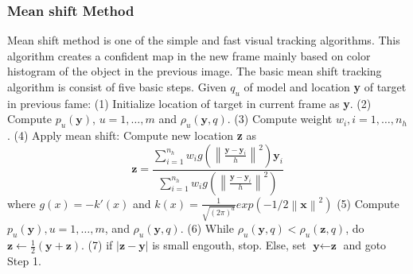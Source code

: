 \documentclass[letterpaper, 10 pt, conference]{ieeeconf}  %
\begin{document}
\subsubsection{Mean shift Method \cite{comaniciu2002mean}}
Mean shift method is one of the simple and fast visual tracking algorithms. This algorithm creates a confident map in the new frame mainly based on color histogram of the object in the previous image. The basic mean shift tracking algorithm is consist of five basic steps. Given ${q_u}$ of model and location \textbf{y} of target in previous fame: (1) Initialize location of target in current frame as \textbf{y}. (2) Compute $ {p_u(\textbf{y}) } $, $ u=1,\dots,m$ and $ \rho_u(\textbf{y},q) $. (3) Compute weight $ w_i,i=1,\dots,n_h$. (4) Apply mean shift: Compute new location \textbf{z} as
\begin{equation} 
\textbf{z}=\frac{\sum_{i=1}^{n_h} w_i g ( \left\| \frac{ \textbf{y} - \textbf{y}_i}{h}\right\|^2)\textbf{y}_i}{ \sum_{i=1}^{n_h} w_i g ( \left\| \frac{ \textbf{y} - \textbf{y}_i}{h}\right\|^2 )} 
\end{equation}                                                      
where $ g(x)=-k'(x)$ and $k(x)=\frac{1}{\sqrt{(2\pi)^d}}exp(-1/2 \left\| \textbf{x} \right\|^2)$ (5) Compute $ {p_u(\textbf{y}) },u=1,\dots,m $, and  $ \rho_u(\textbf{y},q) $. (6) While  $ \rho_u(\textbf{y},q) <   \rho_u(\textbf{z},q) $, do $ \textbf{z} \leftarrow \frac{1}{2}(\textbf{y}+\textbf{z})$. (7) if $ \left| \textbf{z} - \textbf{y} \right|$ is small engouth, stop. Else, set $ \textbf{y} \leftarrow \textbf{z}$ and goto Step 1.
\end{document}
